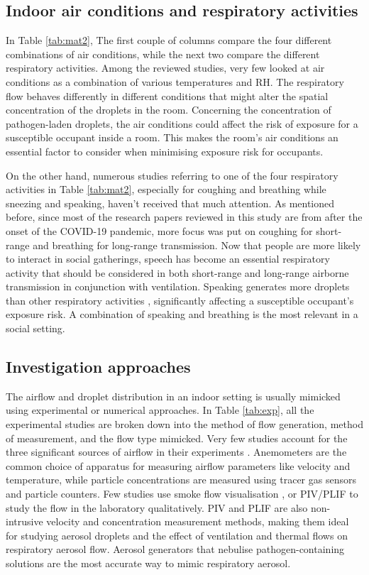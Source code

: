 \documentclass[a4paper,12pt]{elsarticle}
\begin{document}
\subsection{Indoor air conditions and respiratory activities}

In Table \ref{tab:mat2}, The first couple of columns compare the four different combinations of air conditions, while the next two compare the different respiratory activities. Among the reviewed studies, very few looked at air conditions as a combination of various temperatures and RH. The respiratory flow behaves differently in different conditions that might alter the spatial concentration of the droplets in the room. Concerning the concentration of pathogen-laden droplets, the air conditions could affect the risk of exposure for a susceptible occupant inside a room. This makes the room's air conditions an essential factor to consider when minimising exposure risk for occupants.

On the other hand, numerous studies referring to one of the four respiratory activities in Table \ref{tab:mat2}, especially for coughing and breathing while sneezing and speaking, haven't received that much attention. As mentioned before, since most of the research papers reviewed in this study are from after the onset of the COVID-19 pandemic, more focus was put on coughing for short-range and breathing for long-range transmission. Now that people are more likely to interact in social gatherings, speech has become an essential respiratory activity that should be considered in both short-range and long-range airborne transmission in conjunction with ventilation. Speaking generates more droplets than other respiratory activities \cite{giri2022colliding}, significantly affecting a susceptible occupant's exposure risk. A combination of speaking and breathing is the most relevant in a social setting.

\subsection{Investigation approaches}

The airflow and droplet distribution in an indoor setting is usually mimicked using experimental or numerical approaches. In Table \ref{tab:exp}, all the experimental studies are broken down into the method of flow generation, method of measurement, and the flow type mimicked. Very few studies account for the three significant sources of airflow in their experiments \cite{zhou2021experimental,zhang2019distribution}. Anemometers are the common choice of apparatus for measuring airflow parameters like velocity and temperature, while particle concentrations are measured using tracer gas sensors and particle counters. Few studies use smoke flow visualisation \cite{saarinen2015large,giri2022colliding}, or PIV/PLIF \cite{faleiros2022tu,poussou2010flow} to study the flow in the laboratory qualitatively. PIV and PLIF are also non-intrusive velocity and concentration measurement methods, making them ideal for studying aerosol droplets and the effect of ventilation and thermal flows on respiratory aerosol flow. Aerosol generators that nebulise pathogen-containing solutions are the most accurate way to mimic respiratory aerosol.
\end{document}
